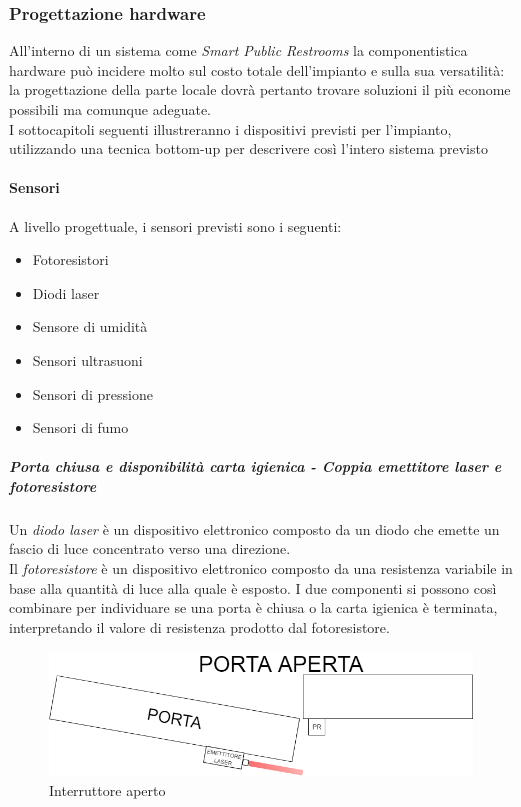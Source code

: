 \documentclass[12pt]{article}
\begin{document}
\subsubsection{Progettazione hardware}
All'interno di un sistema come \textit{Smart Public Restrooms} la componentistica hardware può incidere molto sul costo totale dell'impianto e sulla sua versatilità: la progettazione della parte locale dovrà pertanto trovare soluzioni il più econome possibili ma comunque adeguate.\\
I sottocapitoli seguenti illustreranno i dispositivi previsti per l'impianto, utilizzando una tecnica bottom-up per descrivere così l'intero sistema previsto
\paragraph{Sensori}
A livello progettuale, i sensori previsti sono i seguenti:
\begin{itemize}
\item Fotoresistori
\item Diodi laser
\item Sensore di umidità
\item Sensori ultrasuoni
\item Sensori di pressione
\item Sensori di fumo
\end{itemize}
\subparagraph*{Porta chiusa e disponibilità carta igienica - Coppia emettitore laser e fotoresistore}
Un \textit{diodo laser} è un dispositivo elettronico composto da un diodo che emette un fascio di luce concentrato verso una direzione.\\
Il \textit{fotoresistore} è un dispositivo elettronico composto da una resistenza variabile in base alla quantità di luce alla quale è esposto.
I due componenti si possono così combinare per individuare se una porta è chiusa o la carta igienica è terminata, interpretando il valore di resistenza prodotto dal fotoresistore.
\begin{figure}[h!]
\centering
	\includegraphics[scale=0.45]{img/parteLocale/PortaAperta.png} 
    \caption{Interruttore aperto}
\end{figure}
\end{document}
